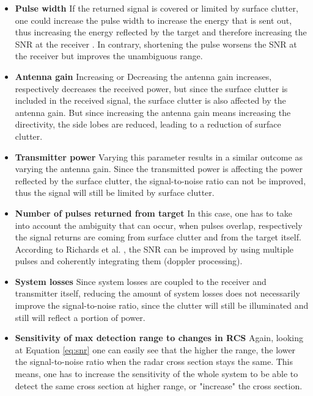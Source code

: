 \begin{itemize}
	\item \textbf{Pulse width}\newline
		If the returned signal is covered or limited by surface clutter, one could increase the pulse width to increase the energy that is sent out, thus increasing the energy reflected by the target and therefore increasing the SNR at the receiver \citep{richards2010principles}.
		In contrary, shortening the pulse worsens the SNR at the receiver but improves the unambiguous range.		
	\item \textbf{Antenna gain} \newline
		Increasing or Decreasing the antenna gain increases, respectively decreases the received power, but since the surface clutter is included in the received signal, the surface clutter is also affected by the antenna gain. But since increasing the antenna gain means increasing the directivity, the side lobes are reduced, leading to a reduction of surface clutter.
	\item \textbf{Transmitter power}\newline
		Varying this parameter results in a similar outcome as varying the antenna gain. Since the transmitted power is affecting the power reflected by the surface clutter, the signal-to-noise ratio can not be improved, thus the signal will still be limited by surface clutter.
	\item \textbf{Number of pulses returned from target}\newline
		In this case, one has to take into account the ambiguity that can occur, when pulses overlap, respectively the signal returns are coming from surface clutter and from the target itself. According to Richards et al. \citep{richards2010principles}, the SNR can be improved by using multiple pulses and coherently integrating them (doppler processing).
	\item \textbf{System losses}\newline
		Since system losses are coupled to the receiver and transmitter itself, reducing the amount of system losses does not necessarily improve the signal-to-noise ratio, since the clutter will still be illuminated and still will reflect a portion of power.
	\item \textbf{Sensitivity of max detection range to changes in RCS}
		Again, looking at Equation \ref{eq:snr} one can easily see that the higher the range, the lower the signal-to-noise ratio when the radar cross section stays the same. This means, one has to increase the sensitivity of the whole system to be able to detect the same cross section at higher range, or "increase" the cross section.
\end{itemize}


